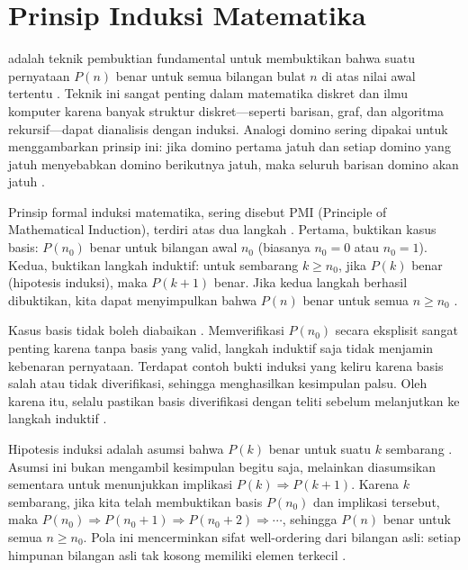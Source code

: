 \section{Prinsip Induksi Matematika}

 adalah teknik pembuktian fundamental untuk membuktikan bahwa suatu pernyataan $P(n)$ benar untuk semua bilangan bulat $n$ di atas nilai awal tertentu \cite{levin_discrete,brilliant_induction,rosen2019}. Teknik ini sangat penting dalam matematika diskret dan ilmu komputer karena banyak struktur diskret---seperti barisan, graf, dan algoritma rekursif---dapat dianalisis dengan induksi. Analogi domino sering dipakai untuk menggambarkan prinsip ini: jika domino pertama jatuh dan setiap domino yang jatuh menyebabkan domino berikutnya jatuh, maka seluruh barisan domino akan jatuh \cite{brilliant_induction,discrete_induction}.

Prinsip formal induksi matematika, sering disebut PMI (Principle of Mathematical Induction), terdiri atas dua langkah \cite{discrete_induction,wiki_induction}. Pertama, buktikan kasus basis: $P(n_0)$ benar untuk bilangan awal $n_0$ (biasanya $n_0 = 0$ atau $n_0 = 1$). Kedua, buktikan langkah induktif: untuk sembarang $k \geq n_0$, jika $P(k)$ benar (hipotesis induksi), maka $P(k+1)$ benar. Jika kedua langkah berhasil dibuktikan, kita dapat menyimpulkan bahwa $P(n)$ benar untuk semua $n \geq n_0$ \cite{levin_discrete,uottawa_induction}.

Kasus basis tidak boleh diabaikan \cite{brilliant_induction,libretexts_induction}. Memverifikasi $P(n_0)$ secara eksplisit sangat penting karena tanpa basis yang valid, langkah induktif saja tidak menjamin kebenaran pernyataan. Terdapat contoh bukti induksi yang keliru karena basis salah atau tidak diverifikasi, sehingga menghasilkan kesimpulan palsu. Oleh karena itu, selalu pastikan basis diverifikasi dengan teliti sebelum melanjutkan ke langkah induktif \cite{discrete_induction,rosen2019}.

Hipotesis induksi adalah asumsi bahwa $P(k)$ benar untuk suatu $k$ sembarang \cite{uottawa_induction,mit_6042}. Asumsi ini bukan mengambil kesimpulan begitu saja, melainkan diasumsikan sementara untuk menunjukkan implikasi $P(k) \Rightarrow P(k+1)$. Karena $k$ sembarang, jika kita telah membuktikan basis $P(n_0)$ dan implikasi tersebut, maka $P(n_0) \Rightarrow P(n_0+1) \Rightarrow P(n_0+2) \Rightarrow \cdots$, sehingga $P(n)$ benar untuk semua $n \geq n_0$. Pola ini mencerminkan sifat well-ordering dari bilangan asli: setiap himpunan bilangan asli tak kosong memiliki elemen terkecil \cite{levin_discrete,wiki_induction}.

